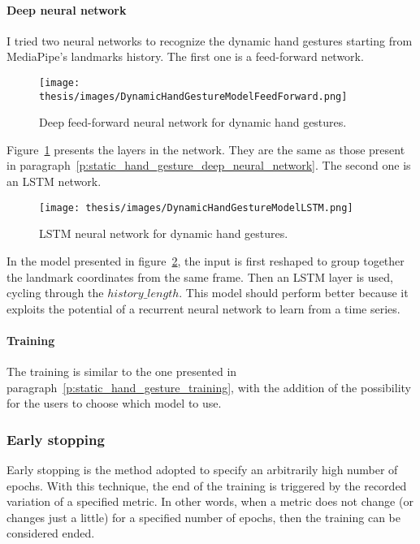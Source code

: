 \documentclass[../thesis.tex]{subfiles}
\begin{document}
\paragraph{Deep neural network}
I tried two neural networks to recognize the dynamic hand gestures starting from MediaPipe's landmarks history. The first one is a feed-forward network.
\begin{figure}[H]
    \centering
    \texttt{[image: thesis/images/DynamicHandGestureModelFeedForward.png]}
    \caption{Deep feed-forward neural network for dynamic hand gestures.}
    \label{fig:ff_model_dynamic_hand_gestures}
\end{figure}
Figure~\ref{fig:ff_model_dynamic_hand_gestures} presents the layers in the network.  They are the same as those present in paragraph~\ref{p:static_hand_gesture_deep_neural_network}.
The second one is an \acrshort{LSTM} network.
\begin{figure}[H]
    \centering
    \texttt{[image: thesis/images/DynamicHandGestureModelLSTM.png]}
    \caption{\acrshort{LSTM} neural network for dynamic hand gestures.}
    \label{fig:lstm_model_dynamic_hand_gestures}
\end{figure}
In the model presented in figure~\ref{fig:lstm_model_dynamic_hand_gestures}, the input is first reshaped to group together the landmark coordinates from the same frame. Then an LSTM layer is used, cycling through the  $history\_length$. This model should perform better because it exploits the potential of a recurrent neural network to learn from a time series.

\paragraph{Training}
The training is similar to the one presented in paragraph~\ref{p:static_hand_gesture_training}, with the addition of the possibility for the users to choose which model to use.

\subsubsection{Early stopping}
Early stopping is the method adopted to specify an arbitrarily high number of epochs. With this technique, the end of the training is triggered by the recorded variation of a specified metric. In other words, when a metric does not change (or changes just a little) for a specified number of epochs, then the training can be considered ended.\\
\end{document}

